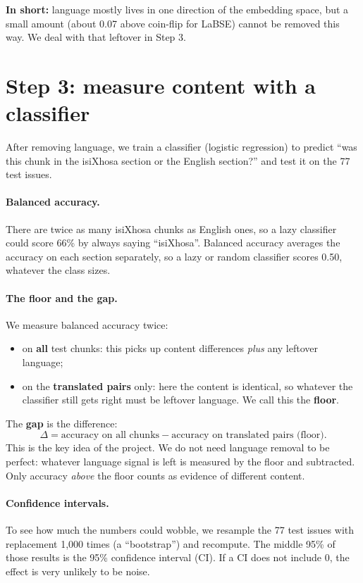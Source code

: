 \documentclass[11pt,a4paper]{article}
\newcommand{\takeaway}[1]{\par\smallskip\noindent\colorbox{black!6}{\parbox{\dimexpr\linewidth-2\fboxsep}{\textbf{In short:} #1}}\par\smallskip}
\begin{document}
\takeaway{language mostly lives in one direction of the embedding space, but a small amount (about 0.07
above coin-flip for LaBSE) cannot be removed this way. We deal with that leftover in Step 3.}

\section{Step 3: measure content with a classifier}
After removing language, we train a classifier (logistic regression) to predict ``was this chunk in
the isiXhosa section or the English section?'' and test it on the 77 test issues.

\paragraph{Balanced accuracy.} There are twice as many isiXhosa chunks as English ones, so a lazy
classifier could score 66\% by always saying ``isiXhosa''. Balanced accuracy averages the accuracy on
each section separately, so a lazy or random classifier scores 0.50, whatever the class sizes.

\paragraph{The floor and the gap.} We measure balanced accuracy twice:
\begin{itemize}
  \item on \textbf{all} test chunks: this picks up content differences \emph{plus} any leftover language;
  \item on the \textbf{translated pairs} only: here the content is identical, so whatever the classifier
  still gets right must be leftover language. We call this the \textbf{floor}.
\end{itemize}
The \textbf{gap} is the difference:
\[
  \Delta = \text{accuracy on all chunks} - \text{accuracy on translated pairs (floor)}.
\]
This is the key idea of the project. We do not need language removal to be perfect: whatever language
signal is left is measured by the floor and subtracted. Only accuracy \emph{above} the floor counts as
evidence of different content.

\paragraph{Confidence intervals.} To see how much the numbers could wobble, we resample the 77 test
issues with replacement 1{,}000 times (a ``bootstrap'') and recompute. The middle 95\% of those results is
the 95\% confidence interval (CI). If a CI does not include 0, the effect is very unlikely to be noise.
\end{document}
